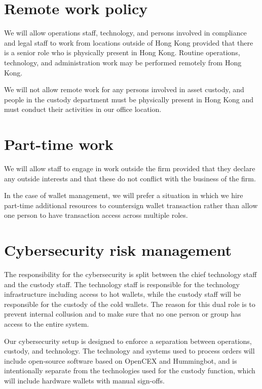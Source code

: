\section{Remote work policy}
We will allow operations staff, technology, and persons involved in
compliance and legal staff to work from locations outside of Hong Kong
provided that there is a senior role who is physically present in Hong
Kong.  Routine operations, technology, and administration work may be
performed remotely from Hong Kong.

We will not allow remote work for any persons involved in asset
custody, and people in the custody department must be physically
present in Hong Kong and must conduct their activities in our office
location.

\section{Part-time work}
We will allow staff to engage in work outside the firm provided
that they declare any outside interests and that these do not conflict
with the business of the firm.

In the case of wallet management, we will prefer a situation in which we
hire part-time additional resources to countersign wallet transaction
rather than allow one person to have transaction access across
multiple roles.

\section{Cybersecurity risk management}

The responsibility for the cybersecurity is split between the chief
technology staff and the custody staff.  The technology staff is
responsible for the technology infrastructure including access to hot
wallets, while the custody staff will be responsible for the custody
of the cold wallets.  The reason for this dual role is to prevent
internal collusion and to make sure that no one person or group has
access to the entire system.

Our cybersecurity setup is designed to enforce a separation between
operations, custody, and technology.  The technology and systems used
to process orders will include open-source software based on OpenCEX
and Hummingbot, and is intentionally separate from the technologies
used for the custody function, which will include hardware wallets with
manual sign-offs.

